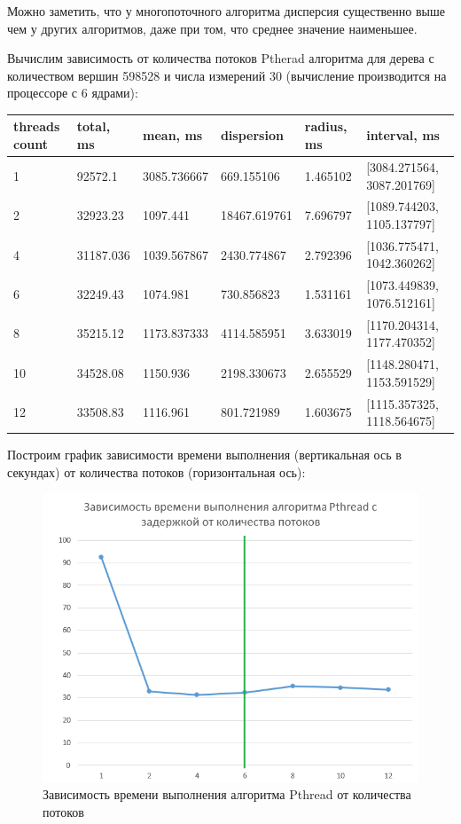\documentclass[14pt,a4paper,report]{report}
\begin{document}
Можно заметить, что у многопоточного алгоритма дисперсия существенно выше чем у других алгоритмов, даже при том, что среднее значение наименьшее.

\clearpage

Вычислим зависимость от количества потоков Ptherad алгоритма для дерева с количеством вершин 598528 и числа измерений 30 (вычисление производится на процессоре с 6 ядрами):

\begin{table}[h!]
	\centering
	\bgroup
	\def\arraystretch{1}
	\begin{tabular}{ | m{2.1cm} | m{1.8cm} | m{1.8cm} | m{2.1cm} | m{2.1cm} | m{4.1cm} | }
		\hline
		threads count & total, ms & mean, ms & dispersion & radius, ms & interval, ms \\ \hline
		1 			  & 92572.1 & 3085.736667 & 669.155106 & 1.465102 & [3084.271564, 3087.201769] \\ \hline
		2 			  & 32923.23 & 1097.441 & 18467.619761 & 7.696797 & [1089.744203, 1105.137797] \\ \hline
		4 			  & 31187.036 & 1039.567867 & 2430.774867 & 2.792396 & [1036.775471, 1042.360262] \\ \hline
		6 			  & 32249.43 & 1074.981 & 730.856823 & 1.531161 & [1073.449839, 1076.512161] \\ \hline
		8 			  & 35215.12 & 1173.837333 & 4114.585951 & 3.633019 & [1170.204314, 1177.470352] \\ \hline
		10 			  & 34528.08 & 1150.936 & 2198.330673 & 2.655529 & [1148.280471, 1153.591529] \\ \hline
		12 			  & 33508.83 & 1116.961 & 801.721989 & 1.603675 & [1115.357325, 1118.564675] \\
		\hline
	\end{tabular}
	\egroup
\end{table}

Построим график зависимости времени выполнения (вертикальная ось в секундах) от количества потоков (горизонтальная ось):

\begin{figure}[h!]
	\centering
	\includegraphics[scale = 0.55]{images/4.png}
	\caption{Зависимость времени выполнения алгоритма Pthread от количества потоков}
	\label{image:4}
\end{figure}
\end{document}
